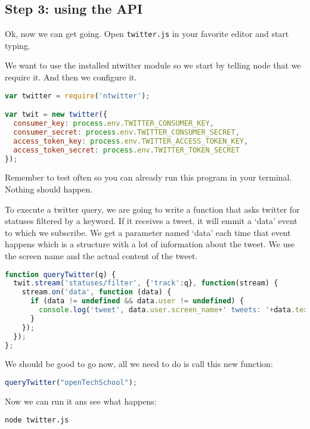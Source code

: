 \documentclass[a4paper]{report}
\begin{document}
\subsection*{Step 3: using the API}
Ok, now we can get going. Open \texttt{twitter.js} in your favorite editor and start typing.

We want to use the installed ntwitter module so we start by telling node that we require it. And then we configure it.

\begin{lstlisting}[language=JavaScript]
var twitter = require('ntwitter');

var twit = new twitter({
  consumer_key: process.env.TWITTER_CONSUMER_KEY,
  consumer_secret: process.env.TWITTER_CONSUMER_SECRET,
  access_token_key: process.env.TWITTER_ACCESS_TOKEN_KEY,
  access_token_secret: process.env.TWITTER_TOKEN_SECRET
});
\end{lstlisting}

\noindent Remember to test often so you can already run this program in your terminal. Nothing should happen.

\noindent To execute a twitter query, we are going to write a function that asks twitter for statuses filtered by a keyword. If it receives a tweet, it will emmit a `data' event to which we subscribe. We get a parameter named `data' each time that event happens which is a structure with a lot of information about the tweet. We use the screen name and the actual content of the tweet.

\begin{lstlisting}[language=JavaScript]
function queryTwitter(q) { 
  twit.stream('statuses/filter', {'track':q}, function(stream) {
    stream.on('data', function (data) {
      if (data != undefined && data.user != undefined) {
        console.log('tweet', data.user.screen_name+' tweets: '+data.text);
      }
    });
  });
};
\end{lstlisting}

\noindent We should be good to go now, all we need to do is call this new function:

\begin{lstlisting}[language=JavaScript]
queryTwitter("openTechSchool");
\end{lstlisting}

\noindent Now we can run it ans see what happens:
\begin{lstlisting}[language=bash]
node twitter.js
\end{lstlisting}
\end{document}
